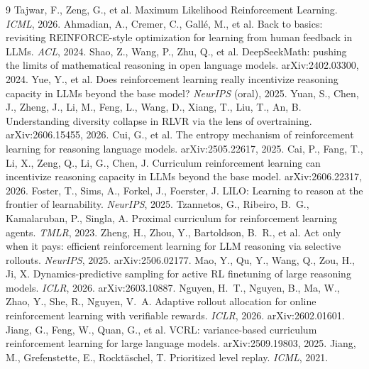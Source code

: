 \begin{thebibliography}{9}\small
{} Tajwar, F., Zeng, G., et al.
Maximum Likelihood Reinforcement Learning. \emph{ICML}, 2026.
 Ahmadian, A., Cremer, C., Gall\'e,
M., et al. Back to basics: revisiting REINFORCE-style optimization for
learning from human feedback in LLMs. \emph{ACL}, 2024.
 Shao, Z., Wang, P., Zhu, Q., et al.
DeepSeekMath: pushing the limits of mathematical reasoning in open language
models. arXiv:2402.03300, 2024.
 Yue, Y., et al. Does reinforcement learning really
incentivize reasoning capacity in LLMs beyond the base model?
\emph{NeurIPS} (oral), 2025.
 Yuan, S., Chen, J., Zheng, J., Li,
M., Feng, L., Wang, D., Xiang, T., Liu, T., An, B. Understanding
diversity collapse in RLVR via the lens of overtraining. arXiv:2606.15455,
2026.
 Cui, G., et al. The entropy mechanism
of reinforcement learning for reasoning language models. arXiv:2505.22617, 2025.
 Cai, P., Fang, T., Li, X., Zeng, Q.,
Li, G., Chen, J. Curriculum reinforcement learning can incentivize
reasoning capacity in LLMs beyond the base model. arXiv:2606.22317,
2026.
 Foster, T., Sims, A., Forkel, J.,
Foerster, J. LILO: Learning to reason at the frontier of learnability.
\emph{NeurIPS}, 2025.
 Tzannetos, G., Ribeiro,
B.~G., Kamalaruban, P., Singla, A. Proximal curriculum for
reinforcement learning agents. \emph{TMLR}, 2023.
 Zheng, H., Zhou, Y., Bartoldson,
B.~R., et al. Act only when it pays: efficient reinforcement learning
for LLM reasoning via selective rollouts. \emph{NeurIPS}, 2025.
arXiv:2506.02177.
 Mao, Y., Qu, Y., Wang, Q., Zou, H.,
Ji, X. Dynamics-predictive sampling for active RL finetuning of large
reasoning models. \emph{ICLR}, 2026. arXiv:2603.10887.
 Nguyen, H.~T., Nguyen, B., Ma, W.,
Zhao, Y., She, R., Nguyen, V.~A. Adaptive rollout allocation for online
reinforcement learning with verifiable rewards. \emph{ICLR}, 2026.
arXiv:2602.01601.
 Jiang, G., Feng, W., Quan, G., et
al. VCRL: variance-based curriculum reinforcement learning for large
language models. arXiv:2509.19803, 2025.
 Jiang, M., Grefenstette, E.,
Rockt\"{a}schel, T. Prioritized level replay. \emph{ICML}, 2021.

\end{thebibliography}
